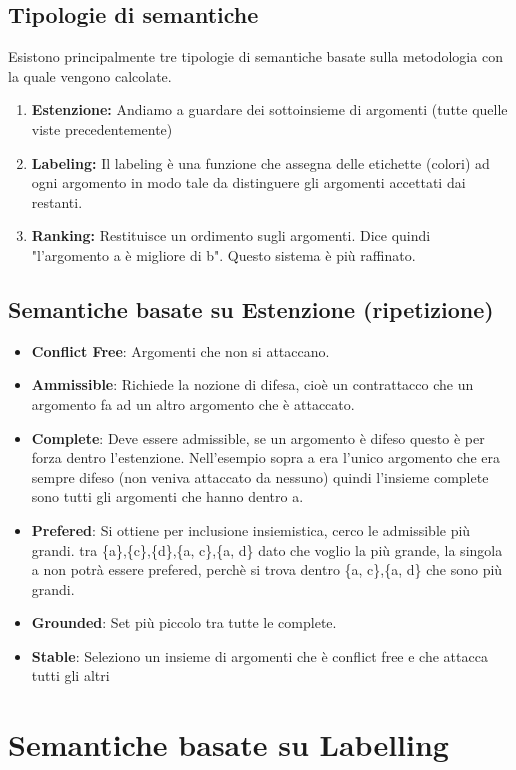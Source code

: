 \section{Tipologie di semantiche}
Esistono principalmente tre tipologie di semantiche basate sulla metodologia
con la quale vengono calcolate.
\begin{enumerate}
    \item \textbf{Estenzione:} Andiamo a guardare dei sottoinsieme di argomenti (tutte quelle viste precedentemente)
    \item \textbf{Labeling:} Il labeling è una funzione che assegna delle etichette (colori) ad ogni argomento in modo tale da distinguere gli argomenti accettati dai restanti.
    \item \textbf{Ranking:} Restituisce un ordimento sugli argomenti. Dice quindi "l’argomento a è migliore di b". Questo sistema è più raffinato.
\end{enumerate}
\section{Semantiche basate su Estenzione (ripetizione)}
\begin{itemize}
    \item \textbf{Conflict Free}: Argomenti che non si attaccano.
    \item \textbf{Ammissible}: Richiede la nozione di difesa, cioè un contrattacco che un argomento fa ad un altro argomento che è attaccato.
    \item \textbf{Complete}: Deve essere admissible, se un argomento è difeso questo è per forza dentro l’estenzione. Nell’esempio sopra a era l’unico argomento che era sempre difeso (non veniva attaccato da nessuno) quindi l’insieme complete sono tutti gli argomenti che hanno dentro a.
    \item \textbf{Prefered}: Si ottiene per inclusione insiemistica, cerco le admissible più grandi. tra \{a\},\{c\},\{d\},\{a, c\},\{a, d\} dato che voglio la più grande, la singola {a} non potrà essere prefered, perchè si trova dentro \{a, c\},\{a, d\} che sono più grandi.
    \item \textbf{Grounded}: Set più piccolo tra tutte le complete.
    \item \textbf{Stable}: Seleziono un insieme di argomenti che è conflict free e che attacca tutti gli altri
\end{itemize}
\chapter{Semantiche basate su Labelling} \label{ch:Semantiche basate su Labelling}
